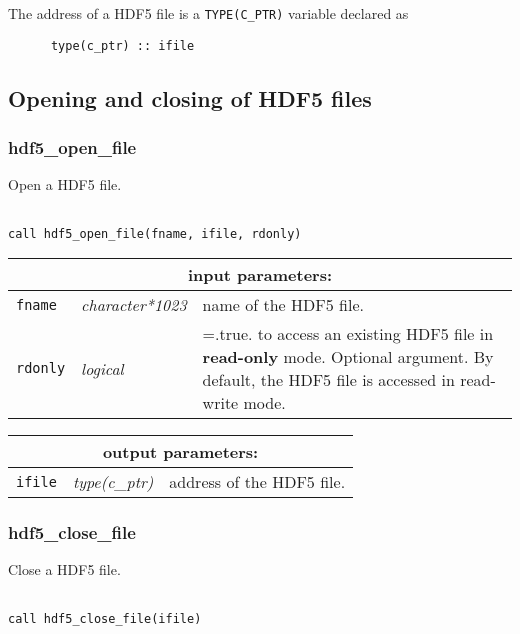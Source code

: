 The address of a HDF5 file is a {\tt TYPE(C\_PTR)} variable declared as
\begin{verbatim}
      type(c_ptr) :: ifile
\end{verbatim}

\vskip 0.8cm

\subsection{Opening and closing of HDF5 files}

\subsubsection{hdf5\_open\_file}

Open a HDF5 file.
\begin{verbatim}

call hdf5_open_file(fname, ifile, rdonly)
\end{verbatim}

\noindent
\begin{tabular}{|p{1.5cm}|p{3cm}|p{10cm}|}
\hline
\multicolumn{3}{|c|}{\bf input parameters:} \\
\hline
{\tt fname} & {\it character*1023} & name of the HDF5 file. \\
\hline
{\tt rdonly} & {\it logical} & =.true. to access an existing HDF5 file in {\bf read-only} mode. Optional argument.
By default, the HDF5 file is accessed in read-write mode. \\ 
\hline
\end{tabular}

\vskip 0.8cm

\noindent
\begin{tabular}{|p{1.5cm}|p{3cm}|p{10cm}|}
\hline
\multicolumn{3}{|c|}{\bf output parameters:} \\
\hline
{\tt ifile} & {\it type(c\_ptr)} & address of the HDF5 file. \\
\hline
\end{tabular}

\subsubsection{hdf5\_close\_file}

Close a HDF5 file.

\begin{verbatim}

call hdf5_close_file(ifile)
\end{verbatim}

